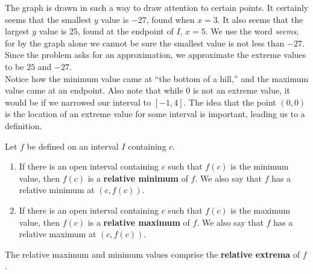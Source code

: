 {The graph is drawn in such a way to draw attention to certain points. It certainly seems that the smallest $y$ value is $-27$, found when $x=3$. It also seems that the largest $y$ value is 25, found at the endpoint of $I$, $x=5$. We use the word \textit{seems}, for by the graph alone we cannot be sure the smallest value is not less than $-27$. Since the problem asks for an approximation, we approximate the extreme values to be $25$ and $-27$.
}\\

Notice how the minimum value came at ``the bottom of a hill,'' and the maximum value came at an endpoint. Also note that while $0$ is not an extreme value, it would be if we narrowed our interval to $[-1,4]$. The idea that the point $(0,0)$ is the location of an extreme value for some interval is important, leading us to a definition.


{}%
{Let $f$ be defined on an interval $I$ containing $c$. 
		\begin{enumerate}
		\item		If there is an open interval containing $c$ such that $f(c)$ is the minimum value, then $f(c)$ is a \textbf{relative minimum} of $f$. We also say that $f$ has a relative minimum at $(c,f(c))$. 
		\item		If there is an open interval containing $c$ such that $f(c)$ is the maximum value, then $f(c)$ is a \textbf{relative maximum} of $f$. We also say that $f$ has a relative maximum at $(c,f(c))$. 
		\end{enumerate}
		
The relative maximum and minimum values comprise the \textbf{relative extrema} of $f$.
}

